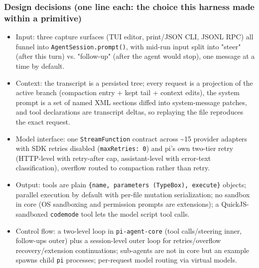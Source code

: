 \subsubsection*{Design decisions (one line each: the choice this harness made within a primitive)}
\begin{itemize}
\item Input: three capture surfaces (TUI editor, print/JSON CLI, JSONL RPC) all funnel into \texttt{AgentSession.\allowbreak{}prompt(\allowbreak{})}, with mid-run input split into "steer" (after this turn) vs. "follow-up" (after the agent would stop), one message at a time by default.
\item Context: the transcript is a persisted tree; every request is a projection of the active branch (compaction entry + kept tail + context edits), the system prompt is a set of named XML sections diffed into system-message patches, and tool declarations are transcript deltas, so replaying the file reproduces the exact request.
\item Model interface: one \texttt{StreamFunction} contract across \textasciitilde{}15 provider adapters with SDK retries disabled (\texttt{maxRetries:\allowbreak{} 0}) and pi's own two-tier retry (HTTP-level with retry-after cap, assistant-level with error-text classification), overflow routed to compaction rather than retry.
\item Output: tools are plain \texttt{\{name, parameters (\allowbreak{}TypeBox), execute\}} objects; parallel execution by default with per-file mutation serialization; no sandbox in core (OS sandboxing and permission prompts are extensions); a QuickJS-sandboxed \texttt{codemode} tool lets the model script tool calls.
\item Control flow: a two-level loop in \texttt{pi-\allowbreak{}agent-\allowbreak{}core} (tool calls/steering inner, follow-ups outer) plus a session-level outer loop for retries/overflow recovery/extension continuations; sub-agents are not in core but an example spawns child \texttt{pi} processes; per-request model routing via virtual models.
\end{itemize}

